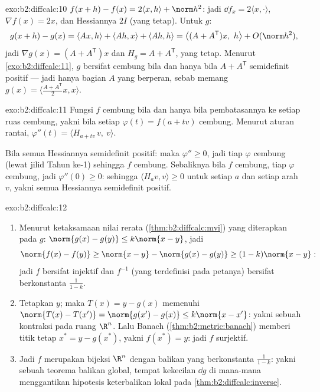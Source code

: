 \begin{solution}{exo:b2:diffcalc:10}
$f(x+h) - f(x) = 2\langle x, h\rangle + \norm h^2$: jadi $\dd f_x =
2\langle x, \cdot\rangle$, $\nabla f(x) = 2x$, dan Hessiannya $2I$
(yang tetap). Untuk $g$:
\[
g(x + h) - g(x) = \langle Ax, h\rangle + \langle Ah, x\rangle
+ \langle Ah, h\rangle
= \bigl\langle (A + A^{\mathsf T})x,\ h\bigr\rangle +
O(\norm h^2),
\]
jadi $\nabla g(x) = (A + A^{\mathsf T})x$ dan $H_g = A +
A^{\mathsf T}$, yang tetap. Menurut \cref{exo:b2:diffcalc:11}, $g$ bersifat
cembung bila dan hanya bila $A + A^{\mathsf T}$ semidefinit positif ---
jadi hanya bagian  $A$ yang berperan, sebab memang $g(x) =
\langle \frac{A + A^{\mathsf T}}2 x, x\rangle$.
\end{solution}

\begin{solution}{exo:b2:diffcalc:11}
Fungsi $f$ cembung bila dan hanya bila pembatasannya ke setiap ruas cembung,
yakni bila setiap $\varphi(t) = f(a + tv)$ cembung. Menurut aturan
rantai, $\varphi''(t) = \langle H_{a+tv}\,v,\ v\rangle$.

Bila semua Hessiannya semidefinit positif: maka $\varphi'' \geq 0$,
jadi tiap $\varphi$ cembung (lewat jilid Tahun ke-1) sehingga $f$ cembung.
Sebaliknya bila $f$ cembung, tiap $\varphi$ cembung, jadi
$\varphi''(0) \geq 0$: sehingga $\langle H_a v, v\rangle \geq 0$ untuk
setiap $a$ dan setiap arah $v$, yakni semua Hessiannya semidefinit
positif.
\end{solution}

\begin{solution}{exo:b2:diffcalc:12}
\begin{enumerate}
  \item Menurut ketaksamaan nilai rerata
        (\cref{thm:b2:diffcalc:mvi}) yang diterapkan pada $g$:
        $\norm{g(x) - g(y)} \leq k\norm{x-y}$, jadi
        \[
        \norm{f(x) - f(y)} \geq \norm{x - y} - \norm{g(x) -
        g(y)} \geq (1 - k)\norm{x - y} :
        \]
        jadi $f$ bersifat injektif dan $f^{-1}$ (yang terdefinisi pada petanya) bersifat
         berkonstanta $\frac{1}{1-k}$.
  \item Tetapkan $y$; maka $T(x) = y - g(x)$ memenuhi $\norm{T(x) -
        T(x')} = \norm{g(x') - g(x)} \leq k\norm{x - x'}$: yakni sebuah
        kontraksi pada ruang  $\R^n$. Lalu Banach
        (\cref{thm:b2:metric:banach}) memberi titik tetap $x^*
        = y - g(x^*)$, yakni $f(x^*) = y$: jadi $f$ surjektif.
  \item Jadi $f$ merupakan bijeksi $\R^n$ dengan balikan yang
         berkonstanta $\frac{1}{1-k}$: yakni sebuah teorema balikan
        global, tempat kekecilan $\dd g$ di mana-mana
        menggantikan hipotesis keterbalikan lokal pada
        \cref{thm:b2:diffcalc:inverse}.
\end{enumerate}
\end{solution}

